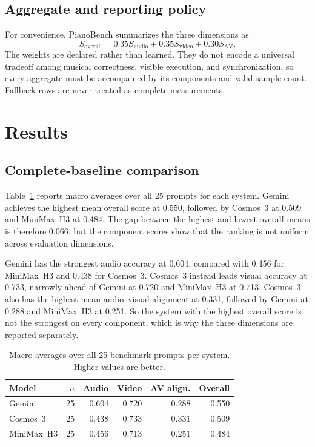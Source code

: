 \documentclass{article}
\begin{document}
\subsection{Aggregate and reporting policy}

For convenience, PianoBench summarizes the three dimensions as
\begin{equation}
  S_{\mathrm{overall}}
  = 0.35S_{\mathrm{audio}}
  + 0.35S_{\mathrm{video}}
  + 0.30S_{\mathrm{AV}}.
  \label{eq:overall-score}
\end{equation}
The weights are declared rather than learned. They do not encode a universal tradeoff among musical correctness, visible execution, and synchronization, so every aggregate must be accompanied by its components and valid sample count. Fallback rows are never treated as complete measurements.

\section{Results}
\label{sec:results}

\subsection{Complete-baseline comparison}

Table~\ref{tab:model-summary} reports macro averages over all 25 prompts for each system. Gemini achieves the highest mean overall score at 0.550, followed by Cosmos~3 at 0.509 and MiniMax~H3 at 0.484. The gap between the highest and lowest overall means is therefore 0.066, but the component scores show that the ranking is not uniform across evaluation dimensions.

Gemini has the strongest audio accuracy at 0.604, compared with 0.456 for MiniMax~H3 and 0.438 for Cosmos~3. Cosmos~3 instead leads visual accuracy at 0.733, narrowly ahead of Gemini at 0.720 and MiniMax~H3 at 0.713. Cosmos~3 also has the highest mean audio--visual alignment at 0.331, followed by Gemini at 0.288 and MiniMax~H3 at 0.251. So the system with the highest overall score is not the strongest on every component, which is why the three dimensions are reported separately.

\begin{table}[t]
  \caption{Macro averages over all 25 benchmark prompts per system. Higher values are better.}
  \label{tab:model-summary}
  \centering
  \begin{tabular}{@{}lrrrrr@{}}
    \toprule
    Model & $n$ & Audio & Video & AV align. & Overall \\
    \midrule
    Gemini & 25 & 0.604 & 0.720 & 0.288 & 0.550 \\
    Cosmos~3 & 25 & 0.438 & 0.733 & 0.331 & 0.509 \\
    MiniMax~H3 & 25 & 0.456 & 0.713 & 0.251 & 0.484 \\
    \bottomrule
  \end{tabular}
\end{table}
\end{document}

